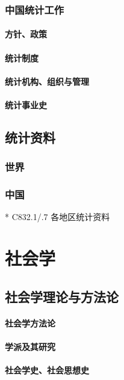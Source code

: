 \documentclass[UTF8]{../RepresentationUniverse}
\begin{document}
    \subsection{中国统计工作}
        \subsubsection{方针、政策}
        \subsubsection{统计制度}
        \subsubsection{统计机构、组织与管理}
        \subsubsection{统计事业史}
\section{统计资料}
    \subsection{世界}
    \subsection{中国}
      * C832.1/.7 各地区统计资料





\chapter{社会学}
\section{社会学理论与方法论}
    \subsubsection{社会学方法论}
    \subsubsection{学派及其研究}
    \subsubsection{社会学史、社会思想史}
\end{document}
